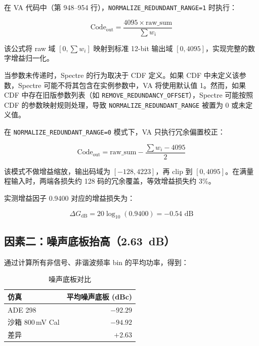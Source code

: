\documentclass[12pt,a4paper]{article}
\begin{document}
在 VA 代码中（第 948--954 行），\texttt{NORMALIZE\_REDUNDANT\_RANGE=1} 时执行：

\begin{equation}
\text{Code}_{\text{out}} = \frac{4095 \times \text{raw\_sum}}{\sum w_i}
\end{equation}

该公式将 raw 域 $[0, \sum w_i]$ 映射到标准 12-bit 输出域 $[0, 4095]$，实现完整的数字增益归一化。

当参数未传递时，Spectre 的行为取决于 CDF 定义。如果 CDF 中未定义该参数，Spectre 可能不将其包含在实例参数中，VA 将使用默认值 1。然而，如果 CDF 中存在旧版参数列表（如 \texttt{REMOVE\_REDUNDANCY\_OFFSET}），Spectre 可能按照 CDF 的参数映射规则处理，导致 \texttt{NORMALIZE\_REDUNDANT\_RANGE} 被置为 0 或未定义值。

在 \texttt{NORMALIZE\_REDUNDANT\_RANGE=0} 模式下，VA 只执行冗余偏置校正：

\begin{equation}
\text{Code}_{\text{out}} = \text{raw\_sum} - \frac{\sum w_i - 4095}{2}
\end{equation}

该模式不做增益缩放，输出码域为 $[-128, 4223]$，再 clip 到 $[0, 4095]$。在满量程输入时，两端各损失约 128 码的冗余覆盖，等效增益损失约 3\%。

实测增益因子 0.9400 对应的增益损失为：

\begin{equation}
\Delta G_{\text{dB}} = 20 \log_{10}(0.9400) = -0.54 \text{ dB}
\end{equation}

\subsection{因素二：噪声底板抬高（\SI{2.63}{dB}）}

通过计算所有非信号、非谐波频率 bin 的平均功率，得到：

\begin{table}[H]
\centering
\caption{噪声底板对比}
\label{tab:noise_floor}
\begin{tabular}{lr}
\toprule
仿真 & 平均噪声底板 (dBc) \\
\midrule
ADE 298 & $-92.29$ \\
沙箱 800\,mV Cal & $-94.92$ \\
差异 & $+2.63$ \\
\bottomrule
\end{tabular}
\end{table}
\end{document}
